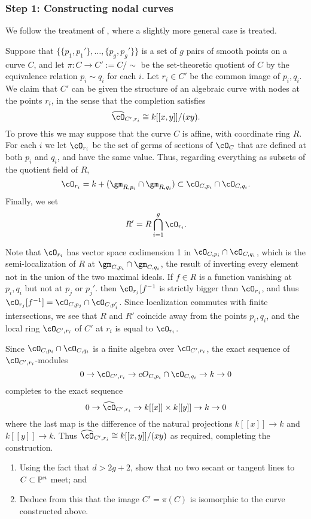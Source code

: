 \subsubsection{Step 1: Constructing nodal curves}
We follow the treatment of \cite{Serre, Corps locaux, pp70ff},
 where a slightly more general case is treated.
 
Suppose that $\{\{p_1,p_1'\},\dots, \{p_g,p_g'\}\}$ is a set of $g$ pairs of smooth points on a curve $C$, and let $\pi: C \to C':=C/\sim$ be the set-theoretic quotient of $C$ by the equivalence relation
 $p_i\sim q_i$ for each $i$. Let $r_i\in C'$ be the common image of $p_i, q_i$. We claim that $C'$ can be given the structure of an  algebraic curve with nodes at the points $r_i$, in the sense that the completion satisfies
$$
\widehat\cO_{C', r_i} \cong k[[x,y]]/(xy).
$$
 To prove this we may suppose that the curve $C$ is affine, with coordinate ring $R$.
For each $i$ we let $\cO_{r_i}$  be the set of germs of sections of $\cO_C$ that are
 defined at both $p_i$ and $q_i$, and have the same value. Thus, regarding everything
 as subsets of the quotient field of $R$, 
 $$
 \cO_{r_i} = k+(\gm_{R,p_i} \cap \gm_{R,q_i}) \subset \cO_{C,p_i}\cap \cO_{C,q_i}.
 $$
 Finally, we set 
 $$
 R' = R \bigcap_{i=1}^g \cO_{r_i}.
 $$

Note that $\cO_{r_i}$ has vector space codimension 1 in 
 $\cO_{C,p_i}\cap \cO_{C,q_i}$, which is the semi-localization of $R$ at
 $\gm_{C,p_i}\cap \gm_{C,q_i}$, the result of inverting every element not in the 
 union of the two maximal ideals. If $f\in R$ is a function vanishing at $p_i, q_i$ but not at $p_j$ or $p_j'$.
then $\cO_{r_j}[f^{-1}$ is strictly bigger than
$\cO_{r_j}$, and thus $\cO_{r_j} [f^{-1}] = \cO_{C,p_j} \cap \cO_{C,p_j'}$.
Since localization commutes with finite intersections, we see that $R$ and $R'$
coincide away from the points $p_i,q_i$, and the local ring $\cO_{C',r_i}$ of $C'$ at $r_i$ is
equal to $\cO_{r_i}$.

Since $\cO_{C,p_i}\cap \cO_{C,q_i}$ is a finite algebra over $\cO_{C', r_i}$,
the exact sequence of $\cO_{C', r_i}$-modules
$$
0\to \cO_{C', r_i} \to cO_{C,p_i}\cap \cO_{C,q_i} \to k \to 0
$$
completes to the exact sequence
$$
0\to \widehat\cO_{C', r_i} \to k[[x]]\times k[[y]] \to k \to 0
$$
where the last map is the difference of the natural projections
$k[[x]] \to k$ and $k[[y]] \to k$. Thus
$\widehat\cO_{C', r_i} \cong k[[x,y]]/(xy)$ as required, completing the construction.

\begin{exercise}
\begin{enumerate}
\item Using the fact that $d > 2g+2$, show that no two secant or tangent lines to $C \subset \PP^n$ meet; and
\item Deduce from this that the image $C' = \pi(C)$ is isomorphic to the curve constructed above.
\end{enumerate}
\end{exercise}

